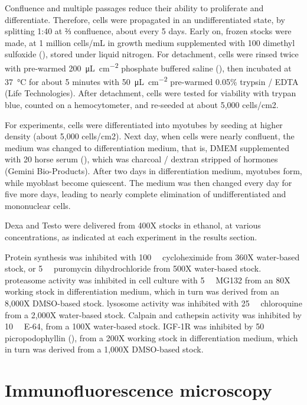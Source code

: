 \documentclass[12pt,english]{report}\usepackage[]{graphicx}\usepackage[]{color}
\begin{document}
Confluence and multiple passages reduce their ability to proliferate
and differentiate. Therefore, cells were propagated in an undifferentiated
state, by splitting 1:40 at ⅔ confluence, about every 5 days. Early
on, frozen stocks were made, at 1 million cells/mL in growth medium
supplemented with \SI{100}{\promille} dimethyl sulfoxide (),
stored under liquid nitrogen. For detachment, cells were rinsed twice
with pre-warmed \SI{200}{\micro\liter\per\centi\meter\squared} phosphate
buffered saline (),
then incubated at \SI{37}{\celsius} for about 5 minutes with \SI{50}{\micro\liter\per\centi\meter\squared}
pre-warmed 0.05\% trypsin / EDTA (Life Technologies). After detachment,
cells were tested for viability with trypan blue, counted on a hemocytometer,
and re-seeded at about 5,000 cells/cm2.

For experiments, cells were differentiated into myotubes by seeding
at higher density (about 5,000 cells/cm2). Next day, when cells were
nearly confluent, the medium was changed to differentiation medium,
that is, DMEM supplemented with \SI{20}{\promille} horse serum (),
which was charcoal / dextran stripped of hormones (Gemini Bio-Products).
After two days in differentiation medium, myotubes form, while myoblast
become quiescent. The medium was then changed every day for five more
days, leading to nearly complete elimination of undifferentiated and
mononuclear cells.

Dexa and Testo were delivered from 400X stocks in ethanol, at various
concentrations, as indicated at each experiment in the results section.

Protein synthesis was inhibited with \SI{100}{\micro\molar} cycloheximide
from 360X water-based stock, or \SI{5}{\micro\molar} puromycin dihydrochloride
from 500X water-based stock. proteasome activity was inhibited in
cell culture with \SI{5}{\micro\molar} MG132 from an 80X working
stock in differentiation medium, which in turn was derived from an
8,000X DMSO-based stock. lysosome activity was inhibited with \SI{25}{\micro\molar}
chloroquine from a 2,000X water-based stock. Calpain and cathepsin
activity was inhibited by \SI{10}{\micro\molar} E-64, from a 100X
water-based stock. IGF-1R was inhibited by \SI{50}{\nano\molar} picropodophyllin
(), from a 200X working stock
in differentiation medium, which in turn was derived from a 1,000X
DMSO-based stock.


\section{Immunofluorescence microscopy}
\end{document}
